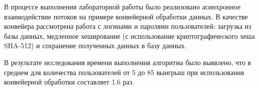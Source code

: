 \documentclass[../report.tex]{subfiles}
\begin{document}
В процессе выполнения лабораторной работы было реализовано асинхронное взаимодействие потоков на примере конвейерной обработки данных. В качестве конвейера рассмотрена работа с логинами и паролями пользователей: загрузка из базы данных, медленное хеширование (с использование криптографического хеша SHA-512) и сохранение полученных данных в базу данных.

В результате исследования времени выполнения алгоритма было выявлено, что в среднем для количества пользователей от 5 до 85 выигрыш при использования конвейерной обработки составляет 1.6 раз.
\end{document}
